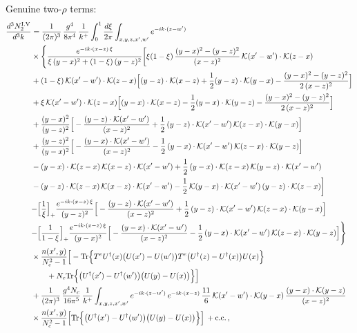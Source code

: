 \documentclass[9pt]{article}
\numberwithin{equation}{section}
\begin{document}
Genuine two-$\rho$ terms:
\begin{align}
\frac{d^{3}N^{\rm I.V}_{2}}{d^{3}k} & =\frac{1}{(2\pi)^{3}}\,\frac{g^{4}}{8\pi^{4}}\,\frac{1}{k^{+}}\int_{0}^{1}\frac{d\xi}{2\pi}\int_{x,y,z,x',w'}e^{-ik\cdot(z-w')}\notag\\
&\times\Bigg\{\frac{e^{-ik\cdot(x-z)\,\xi}}{\xi\,(y-x)^{2}+(1-\xi)\,(y-z)^{2}}\bigg[\xi(1-\xi)\,\frac{(y-x)^{2}-(y-z)^{2}}{(x-z)^{2}}\,\mathcal{K}(x'-w')\cdot\mathcal{K}(z-x)\notag\\
&+(1-\xi)\,\mathcal{K}(x'-w')\cdot\mathcal{K}(z-x)\Big[(y-z)\cdot\mathcal{K}(x-z)+\frac{1}{2}(y-z)\cdot\mathcal{K}(y-x)-\frac{(y-x)^{2}-(y-z)^{2}}{2\,(x-z)^{2}}\Big]\notag\\
&+\xi\,\mathcal{K}(x'-w')\cdot\mathcal{K}(z-x)\Big[(y-x)\cdot\mathcal{K}(x-z)-\frac{1}{2}(y-x)\cdot\mathcal{K}(y-z)-\frac{(y-x)^{2}-(y-z)^{2}}{2\,(x-z)^{2}}\Big]\notag\\
&+\frac{(y-x)^{2}}{(y-z)^{2}}\Big[-\frac{(y-z)\cdot\mathcal{K}(x'-w')}{(x-z)^{2}}+\frac{1}{2}\,(y-z)\cdot\mathcal{K}(x'-w')\,\mathcal{K}(z-x)\cdot\mathcal{K}(y-x)\Big]\notag\\
&+\frac{(y-z)^{2}}{(y-x)^{2}}\Big[-\frac{(y-x)\cdot\mathcal{K}(x'-w')}{(x-z)^{2}}-\frac{1}{2}\,(y-x)\cdot\mathcal{K}(x'-w')\,\mathcal{K}(z-x)\cdot\mathcal{K}(y-z)\Big]\notag\\
&-(y-x)\cdot\mathcal{K}(z-x)\,\mathcal{K}(x-z)\cdot\mathcal{K}(x'-w')+\frac{1}{2}\,(y-x)\cdot\mathcal{K}(z-x)\,\mathcal{K}(y-z)\cdot\mathcal{K}(x'-w')\notag\\
&-(y-z)\cdot\mathcal{K}(z-x)\,\mathcal{K}(x-z)\cdot\mathcal{K}(x'-w')-\frac{1}{2}\,\mathcal{K}(y-x)\cdot\mathcal{K}(x'-w')\,(y-z)\cdot\mathcal{K}(z-x)\bigg]\notag\\
&{-\Big[\frac{1}{\xi}\Big]_{+}\frac{e^{-ik\cdot(x-z)\,\xi}}{(y-z)^{2}}\Big[-\frac{(y-z)\cdot\mathcal{K}(x'-w')}{(x-z)^{2}}+\frac{1}{2}\,(y-z)\cdot\mathcal{K}(x'-w')\,\mathcal{K}(z-x)\cdot\mathcal{K}(y-x)\Big]}\notag\\
&{-\Big[\frac{1}{1-\xi}\Big]_{+}\frac{e^{-ik\cdot(x-z)\,\xi}}{(y-x)^{2}}\Big[-\frac{(y-x)\cdot\mathcal{K}(x'-w')}{(x-z)^{2}}-\frac{1}{2}\,(y-x)\cdot\mathcal{K}(x'-w')\,\mathcal{K}(z-x)\cdot\mathcal{K}(y-z)\Big]}\Bigg\}\notag\\
&\times\frac{n(x',y)}{N_{c}^{2}-1}\Big[-{\rm Tr}\Big\{T^{e}U^{\dagger}(x)\big(U(x')-U(w')\big)T^{e}\big(U^{\dagger}(z)-U^{\dagger}(x)\big)U(x)\Big\}\notag\\&\qquad+N_{c}{\rm Tr}\Big\{\big(U^{\dagger}(x')-U^{\dagger}(w')\big)\big(U(y)-U(x)\big)\Big\}\Big]\notag\\
&+\frac{1}{(2\pi)^{3}}\,\frac{g^{4}N_{c}}{16\pi^{5}}\,\frac{1}{k^{+}}\int_{x,y,z,x',w'}e^{-ik\cdot(z-w')}\,e^{-ik\cdot(x-z)}\,\frac{11}{6}\,\mathcal{K}(x'-w')\cdot\mathcal{K}(y-x)\,\frac{(y-x)\cdot\mathcal{K}(y-z)}{(x-z)^{2}}\notag\\
&\times\frac{n(x',y)}{N_{c}^{2}-1}\Big[{\rm Tr}\Big\{\big(U^{\dagger}(x')-U^{\dagger}(w')\big)\big(U(y)-U(x)\big)\Big\}\Big]\,+{\rm c.c.}\,,\label{eq:S-I.V-2o}
\end{align}
\end{document}
